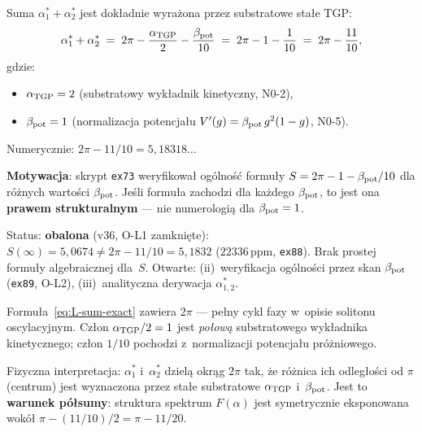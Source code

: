 \begin{hypothesis}%
\label{hyp:L-sum-formula}
Suma $\alpha^*_1 + \alpha^*_2$ jest dokładnie wyrażona przez
substratowe stałe TGP:
\begin{equation}\label{eq:L-sum-exact}
  \alpha^*_1 + \alpha^*_2
  \;=\; 2\pi - \frac{\alpha_{\rm TGP}}{2} - \frac{\beta_{\rm pot}}{10}
  \;=\; 2\pi - 1 - \frac{1}{10}
  \;=\; 2\pi - \frac{11}{10},
\end{equation}
gdzie:
\begin{itemize}[nosep]
  \item $\alpha_{\rm TGP} = 2$ (substratowy wykładnik kinetyczny, N0-2),
  \item $\beta_{\rm pot} = 1$ (normalizacja potencjału $V'(g) = \beta_{\rm pot}\,g^2(1-g)$, N0-5).
\end{itemize}
Numerycznie: $2\pi - 11/10 = 5{,}18318\ldots$

\textbf{Motywacja}: skrypt \texttt{ex73} weryfikował ogólność formuły
$S = 2\pi - 1 - \beta_{\rm pot}/10$ dla różnych wartości $\beta_{\rm pot}$.
Jeśli formuła zachodzi dla każdego $\beta_{\rm pot}$, to jest ona
\textbf{prawem strukturalnym} --- nie numerologią dla $\beta_{\rm pot} = 1$.

Status:  \textbf{obalona} (v36, O-L1 zamkni\k{e}te):
$S(\infty) = 5{,}0674 \neq 2\pi{-}11/10 = 5{,}1832$ ($22336\,\text{ppm}$,
\texttt{ex88}).
Brak prostej formu\l{}y algebraicznej dla~$S$.
Otwarte: (ii)~weryfikacja ogólno\'sci przez skan $\beta_{\rm pot}$
(\texttt{ex89}, O-L2), (iii)~analityczna derywacja $\alpha^*_{1,2}$.
\end{hypothesis}

\begin{remark}
Formuła~\eqref{eq:L-sum-exact} zawiera $2\pi$ --- pełny cykl fazy
w~opisie solitonu oscylacyjnym. Człon $\alpha_{\rm TGP}/2 = 1$ jest
\emph{połową} substratowego wykładnika kinetycznego; człon $1/10$ pochodzi
z~normalizacji potencjału próżniowego.

Fizyczna interpretacja: $\alpha^*_1$ i~$\alpha^*_2$ dzielą okrąg $2\pi$
tak, że różnica ich odległości od $\pi$ (centrum) jest wyznaczona przez
stałe substratowe $\alpha_{\rm TGP}$ i~$\beta_{\rm pot}$.
Jest to \textbf{warunek półsumy}: struktura spektrum $F(\alpha)$ jest
symetrycznie eksponowana wokół $\pi - (11/10)/2 = \pi - 11/20$.
\end{remark}

